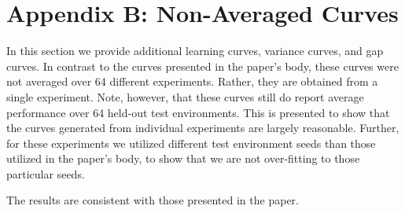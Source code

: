 \section{Appendix B: Non-Averaged Curves}

In this section we provide additional learning curves, variance curves, and gap curves. In contrast to the curves presented in the paper's body, these curves were not averaged over 64 different experiments. Rather, they are obtained from a single experiment. Note, however, that these curves still do report average performance over 64 held-out test environments. This is presented to show that the curves generated from individual experiments are largely reasonable. Further, for these experiments we utilized different test environment seeds than those utilized in the paper's body, to show that we are not over-fitting to those particular seeds.

The results are consistent with those presented in the paper. 


